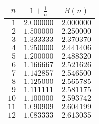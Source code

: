 \begin{tabular}{rcc}                    \toprule
$n$  & $1 + \frac{1}{n}$ & $B(n)$     \\\midrule
$1$  & $2.000000$        & $2.000000$ \\[4pt]
$2$  & $1.500000$        & $2.250000$ \\[4pt]
$3$  & $1.333333$        & $2.370370$ \\[4pt]
$4$  & $1.250000$        & $2.441406$ \\[4pt]
$5$  & $1.200000$        & $2.488320$ \\[4pt]
$6$  & $1.166667$        & $2.521626$ \\[4pt]
$7$  & $1.142857$        & $2.546500$ \\[4pt]
$8$  & $1.125000$        & $2.565785$ \\[4pt]
$9$  & $1.111111$        & $2.581175$ \\[4pt]
$10$ & $1.100000$        & $2.593742$ \\[4pt]
$11$ & $1.090909$        & $2.604199$ \\[4pt]
$12$ & $1.083333$        & $2.613035$ \\\bottomrule
\end{tabular}
